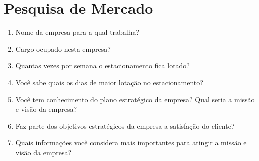 \chapter{Pesquisa de Mercado}

\begin{enumerate}
\item Nome da empresa para a qual trabalha?
\item Cargo ocupado nesta empresa?
\item Quantas vezes por semana o estacionamento fica lotado?
\item Você sabe quais os dias de maior lotação no estacionamento?
\item Você tem conhecimento do plano estratégico da empresa? Qual seria a missão e visão da empresa?
\item Faz parte dos objetivos estratégicos da empresa a satisfação do cliente?
\item Quais informações você considera mais importantes para atingir a missão e visão da empresa?
\end{enumerate}

